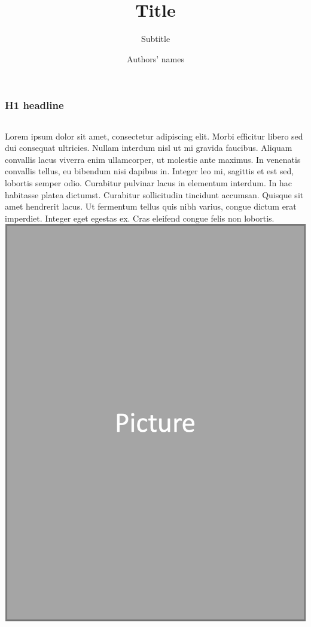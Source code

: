 \documentclass[aspectratio=169]{beamer}
\title{Title}
\subtitle{Subtitle}
\author{Authors' names}
\institute{Institute}
\begin{document}
\maketitle

\begin{frame}
  \frametitle{H1 headline}
  \begin{columns}
      \footnotesize
      Lorem ipsum dolor sit amet, consectetur adipiscing elit. Morbi efficitur libero sed dui consequat ultricies. Nullam interdum nisl ut mi gravida faucibus. Aliquam convallis lacus viverra enim ullamcorper, ut molestie ante maximus. In venenatis convallis tellus, eu bibendum nisi dapibus in. Integer leo mi, sagittis et est sed, lobortis semper odio. Curabitur pulvinar lacus in elementum interdum. In hac habitasse platea dictumst. Curabitur sollicitudin tincidunt accumsan. Quisque sit amet hendrerit lacus.  Ut fermentum tellus quis nibh varius, congue dictum erat imperdiet. Integer eget egestas ex. Cras eleifend congue felis non lobortis.
    \includegraphics[width=\textwidth]{Picture.png}
  \end{columns}
\end{frame}
\end{document}
